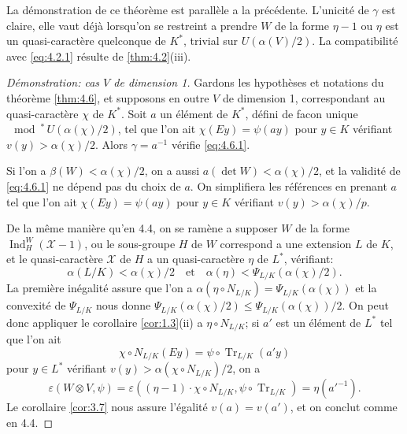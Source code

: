 \documentclass[12pt,a4paper]{article}
\theoremstyle{plain}
\theoremstyle{definition}
\theoremstyle{remark}
\DeclareMathOperator{\Ind}{Ind}
\DeclareMathOperator{\Tr}{Tr}
\newcommand{\cX}{\mathcal{X}}
\providecommand{\cX}{\mathcal{X}}
\providecommand{\Tr}{\operatorname{Tr}}
\begin{document}
La d\'emonstration de ce th\'eor\`eme est parall\`ele a la pr\'ec\'edente. L'unicit\'e de $\gamma$ est claire, elle vaut d\'ej\`a lorsqu'on se restreint a prendre $W$ de la forme $\eta - 1$ ou $\eta$ est un quasi-caract\`ere quelconque de $K^*$, trivial sur $U(\alpha(V)/2)$. La compatibilit\'e avec \eqref{eq:4.2.1} r\'esulte de \ref{thm:4.2}(iii).

\begin{proof}[D\'emonstration: cas $V$ de dimension 1]
Gardons les hypoth\`eses et notations du th\'eor\`eme \ref{thm:4.6}, et supposons en outre $V$ de dimension 1, correspondant au quasi-caract\`ere $\chi$ de $K^*$. Soit $a$ un \'el\'ement de $K^*$, d\'efini de facon unique $\mod^*\, U(\alpha(\chi)/2)$, tel que l'on ait $\chi(Ey) = \psi(ay)$ pour $y \in K$ v\'erifiant $v(y) > \alpha(\chi)/2$. Alors $\gamma = a^{-1}$ v\'erifie \eqref{eq:4.6.1}.

Si l'on a $\beta(W) < \alpha(\chi)/2$, on a aussi $a(\det W) < \alpha(\chi)/2$, et la validit\'e de \eqref{eq:4.6.1} ne d\'epend pas du choix de $a$. On simplifiera les r\'ef\'erences en prenant $a$ tel que l'on ait $\chi(Ey) = \psi(ay)$ pour $y \in K$ v\'erifiant $v(y) > \alpha(\chi)/p$.

De la m\^eme mani\`ere qu'en 4.4, on se ram\`ene a supposer $W$ de la forme $\Ind_H^W(\cX-1)$, ou le sous-groupe $H$ de $W$ correspond a une extension $L$ de $K$, et le quasi-caract\`ere $\cX$ de $H$ a un quasi-caract\`ere $\eta$ de $L^*$, v\'erifiant:
\[
\alpha(L/K) < \alpha(\chi)/2 \quad \text{et} \quad \alpha(\eta) < \Psi_{L/K}(\alpha(\chi)/2).
\]
La premi\`ere in\'egalit\'e assure que l'on a $\alpha(\eta \circ N_{L/K}) = \Psi_{L/K}(\alpha(\chi))$ et la convexit\'e de $\Psi_{L/K}$ nous donne $\Psi_{L/K}(\alpha(\chi)/2) \leq \Psi_{L/K}(\alpha(\chi))/2$. On peut donc appliquer le corollaire \ref{cor:1.3}(ii) a $\eta \circ N_{L/K}$; si $a'$ est un \'el\'ement de $L^*$ tel que l'on ait
\[
\chi \circ N_{L/K}(Ey) = \psi \circ \Tr_{L/K}(a' y)
\]
pour $y \in L^*$ v\'erifiant $v(y) > \alpha(\chi \circ N_{L/K})/2$, on a
\[
\varepsilon(W \otimes V, \psi) = \varepsilon((\eta-1) \cdot \chi \circ N_{L/K}, \psi \circ \Tr_{L/K}) = \eta(a'^{-1}).
\]
Le corollaire \ref{cor:3.7} nous assure l'\'egalit\'e $v(a) = v(a')$, et on conclut comme en 4.4.
\end{proof}

\subsection{}
\label{sec:4.8}
\end{document}
